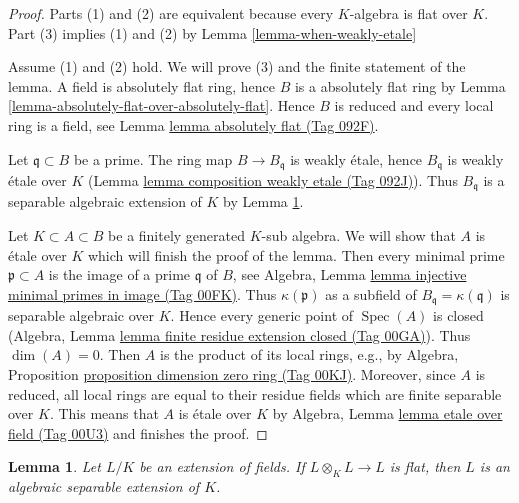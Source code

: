 \documentclass{amsart}
\theoremstyle{plain}
\newtheorem{lemma}[subsection]{Lemma}
\theoremstyle{definition}
\theoremstyle{remark}
\numberwithin{equation}{subsection}
\def\Spec{\mathop{\mathrm{Spec}}}
\begin{document}
\begin{proof}
Parts (1) and (2) are equivalent because every $K$-algebra is flat over $K$.
Part (3) implies (1) and (2) by Lemma \ref{lemma-when-weakly-etale}

\medskip\noindent
Assume (1) and (2) hold. We will prove (3) and the finite statement of
the lemma. A field is absolutely flat ring, hence $B$ is a absolutely
flat ring by Lemma \ref{lemma-absolutely-flat-over-absolutely-flat}.
Hence $B$ is reduced and every local
ring is a field, see Lemma \href{https://stacks.math.columbia.edu/tag/092F}{lemma absolutely flat (Tag 092F)}.

\medskip\noindent
Let $\mathfrak q \subset B$ be a prime. The ring map
$B \to B_\mathfrak q$ is weakly \'etale, hence $B_\mathfrak q$
is weakly \'etale over $K$ (Lemma \href{https://stacks.math.columbia.edu/tag/092J}{lemma composition weakly etale (Tag 092J)}).
Thus $B_\mathfrak q$ is a separable algebraic extension of $K$ by
Lemma \ref{lemma-absolutely-flat-fields}.

\medskip\noindent
Let $K \subset A \subset B$ be a finitely generated $K$-sub algebra.
We will show that $A$ is \'etale over $K$ which will finish the proof
of the lemma.
Then every minimal prime $\mathfrak p \subset A$ is the image of a prime
$\mathfrak q$ of $B$, see
Algebra, Lemma \href{https://stacks.math.columbia.edu/tag/00FK}{lemma injective minimal primes in image (Tag 00FK)}.
Thus $\kappa(\mathfrak p)$ as a subfield of
$B_\mathfrak q = \kappa(\mathfrak q)$ is separable algebraic over $K$.
Hence every generic point of $\Spec(A)$
is closed (Algebra, Lemma \href{https://stacks.math.columbia.edu/tag/00GA}{lemma finite residue extension closed (Tag 00GA)}).
Thus $\dim(A) = 0$.
Then $A$ is the product of its local rings, e.g., by
Algebra, Proposition \href{https://stacks.math.columbia.edu/tag/00KJ}{proposition dimension zero ring (Tag 00KJ)}.
Moreover, since $A$ is reduced, all local rings are equal
to their residue fields which are finite separable over $K$.
This means that $A$ is \'etale over $K$ by
Algebra, Lemma \href{https://stacks.math.columbia.edu/tag/00U3}{lemma etale over field (Tag 00U3)}
and finishes the proof.
\end{proof}


\begin{lemma}
\label{lemma-absolutely-flat-fields}
Let $L/K$ be an extension of fields. If $L \otimes_K L \to L$
is flat, then $L$ is an algebraic separable extension of $K$.
\end{lemma}
\end{document}
